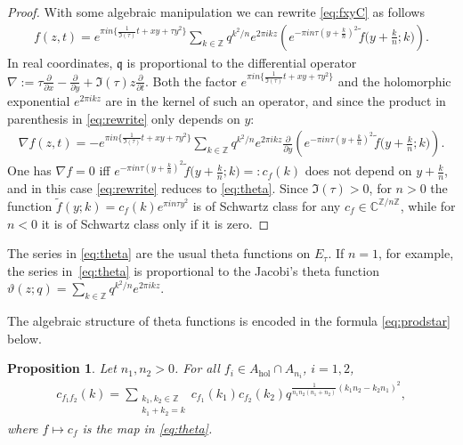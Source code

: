 \documentclass[pdftex]{sigma}
\numberwithin{equation}{section}
\newtheorem{prop}[thm]{Proposition}
\theoremstyle{definition}
\newcommand{\C}{\mathbb{C}}
\newcommand{\Z}{\mathbb{Z}}
\newcommand{\mf}{\mathfrak}
\newcommand{\gb}{\mf{q}}
\begin{document}
\begin{proof}
With some algebraic manipulation we can rewrite \eqref{eq:fxyC} as follows
\begin{gather}\label{eq:rewrite}
f(z,t)=e^{\pi in\{\frac{1}{\Im(\tau)}t+xy+\tau y^2\}}
\sum_{k\in\Z}q^{k^2/n}e^{2\pi ikz}\left(e^{-\pi in\tau(y+\frac{k}{n})^2}
\widetilde{f}\big(y+\tfrac{k}{n};k\big)\right) .
\end{gather}
In real coordinates, $\gb$ is proportional to the dif\/ferential operator
$\nabla:=\tau\frac{\partial}{\partial x}-\frac{\partial}{\partial y}
+\Im(\tau)z\frac{\partial}{\partial t}$. Both the factor
$e^{\pi in\{\frac{1}{\Im(\tau)}t+xy+\tau y^2\}}$ and the holomorphic exponential $e^{2\pi ikz}$ are in the kernel of such an operator, and since
the product in parenthesis in \eqref{eq:rewrite} only depends on $y$:
\begin{gather*}
\nabla f(z,t)=-e^{\pi in\{\frac{1}{\Im(\tau)}t+xy+\tau y^2\}}
\sum_{k\in\Z}q^{k^2/n}e^{2\pi ikz}
\frac{\partial}{\partial y}\left(e^{-\pi in\tau(y+\frac{k}{n})^2}\widetilde{f}\big(y+\tfrac{k}{n};k\big)\right) .
\end{gather*}
One has $\nabla f=0$ if\/f
$e^{-\pi in\tau(y+\frac{k}{n})^2}\widetilde{f}\big(y+\tfrac{k}{n};k\big)=:c_f(k)$ does not depend on $y+\frac{k}{n}$, and in this case \eqref{eq:rewrite} reduces to
\eqref{eq:theta}. Since $\Im(\tau)>0$,
for $n>0$ the function $\widetilde f(y;k)=c_f(k)e^{\pi in\tau y^2}$ is of Schwartz class for any $c_f\in\C^{\Z/n\Z}$, while for $n<0$ it is of
Schwartz class only if it is zero.
\end{proof}

The series in \eqref{eq:theta} are the usual theta functions on $E_\tau$. If $n=1$, for example, the series in~\eqref{eq:theta} is proportional to the Jacobi's theta function
$\vartheta(z;q)=\sum\limits_{k\in\Z}q^{k^2/n}e^{2\pi ikz}$.

The algebraic structure of theta functions is encoded in the formula \eqref{eq:prodstar} below.

\begin{prop}
Let $n_1,n_2>0$.
For all $f_i\in A_{\mathrm{hol}}\cap A_{n_i}$, $i=1,2$,
\begin{gather}\label{eq:prodstar}
c_{f_1f_2}(k)=
\sum_{\substack{k_1,k_2\in\Z \\[1pt] k_1+k_2=k }}c_{f_1}(k_1)c_{f_2}(k_2)q^{\frac{1}{n_1n_2(n_1+n_2)}(k_1n_2-k_2n_1)^2} ,
\end{gather}
where $f\mapsto c_f$ is the map in \eqref{eq:theta}.
\end{prop}
\end{document}

